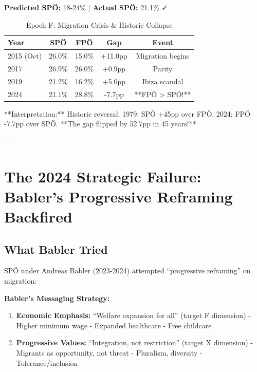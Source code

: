 {{{{{{{{\textbf{Predicted SPÖ:} 18-24\% | \textbf{Actual SPÖ:} 21.1\% ✓

\begin{table}[h]
\centering
\caption{Epoch F: Migration Crisis \& Historic Collapse}
\label{tab:epochf-spo}
\begin{tabular}{lcccc}
\toprule
Year & SPÖ & FPÖ & Gap & Event \\
\midrule
2015 (Oct) & 26.0\% & 15.0\% & +11.0pp & Migration begins \\
2017 & 26.9\% & 26.0\% & +0.9pp & Parity \\
2019 & 21.2\% & 16.2\% & +5.0pp & Ibiza scandal \\
2024 & 21.1\% & 28.8\% & -7.7pp & **FPÖ > SPÖ!** \\
\bottomrule
\end{tabular}
\end{table}

**Interpretation:** Historic reversal. 1979: SPÖ +45pp over FPÖ. 2024: FPÖ -7.7pp over SPÖ. **The gap flipped by 52.7pp in 45 years!**

---

\clearpage


\section{The 2024 Strategic Failure: Babler's Progressive Reframing Backfired}
\label{sec:babler-failure}

\subsection{What Babler Tried}

SPÖ under Andreas Babler (2023-2024) attempted ``progressive reframing'' on migration:

\textbf{Babler's Messaging Strategy:}

\begin{enumerate}

\item \textbf{Economic Emphasis:} ``Welfare expansion for all'' (target F dimension)
   - Higher minimum wage
   - Expanded healthcare
   - Free childcare

\item \textbf{Progressive Values:} ``Integration, not restriction'' (target X dimension)
   - Migrants as opportunity, not threat
   - Pluralism, diversity
   - Tolerance/inclusion


\end{enumerate}}}}}}}}}
